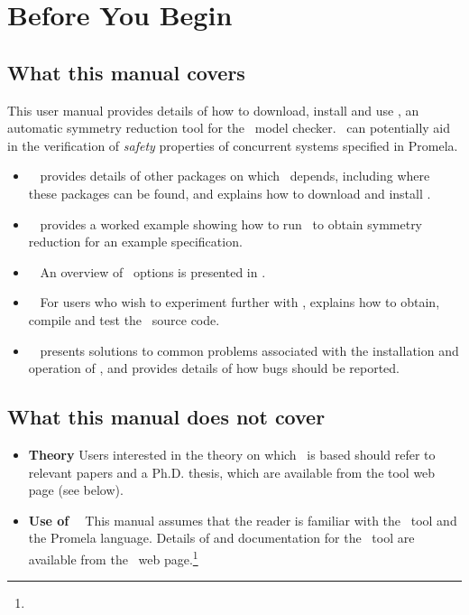 \chapter*{Before You Begin}

\section*{\secfont What this manual covers}

This user manual provides details of how to download, install and
use \topspin, an automatic symmetry reduction tool for the \spin\
model checker.  \topspin\ can potentially aid in the verification of
\emph{safety} properties of concurrent systems specified in Promela.

\begin{itemize}
\item {\bf \downloadingandinstalling\ } 
provides details of other packages on which \topspin\ depends,
including where these packages can be found, and explains how to
download and install \topspin.

\item {\bf \workedexample\ }  provides a worked example showing how to run
\topspin\ to obtain symmetry reduction for an example specification.

\item {\bf \overviewofoptions\ } An overview of
\topspin\ options is presented in .

\item {\bf \buildingfromsource\ } For users who wish to experiment further with \topspin,
\chapref{compilingfromsource} explains how to obtain, compile and
test the \topspin\ source code.

\item {\bf \troubleshooting\ }  presents solutions to common problems
associated with the installation and operation of \topspin, and
provides details of how bugs should be reported.

\end{itemize}

\section*{What this manual does not cover}

\begin{itemize}

\item {\bf Theory } Users interested in the theory on which
\topspin\ is based should refer to relevant papers and a Ph.D.
thesis, which are available from the tool web page (see below).

\item {\bf Use of \spin\ } This manual assumes that the reader is
familiar with the \spin\ tool and the Promela language.  Details of
and documentation for the \spin\ tool are available from the \spin\
web page.\footnote{\texttt{\spinurl}}

\end{itemize}

